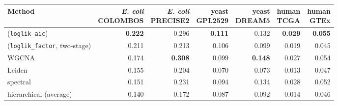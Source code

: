 \begin{tabular}{@{}lrrrrrr@{}}
\hline
Method & \shortstack{\emph{E. coli}\\COLOMBOS} & \shortstack{\emph{E. coli}\\PRECISE2} & \shortstack{yeast\\GPL2529} & \shortstack{yeast\\DREAM5} & \shortstack{human\\TCGA} & \shortstack{human\\GTEx} \\
\hline
\tool{} (\texttt{loglik\_aic}) & \textbf{0.222} & 0.296 & \textbf{0.111} & 0.132 & \textbf{0.029} & \textbf{0.055} \\
\tool{} (\texttt{loglik\_factor}, two-stage) & 0.211 & 0.213 & 0.106 & 0.099 & 0.019 & 0.045 \\
WGCNA & 0.174 & \textbf{0.308} & 0.099 & \textbf{0.148} & 0.027 & 0.054 \\
Leiden & 0.155 & 0.204 & 0.070 & 0.073 & 0.013 & 0.047 \\
spectral & 0.151 & 0.231 & 0.094 & 0.134 & 0.028 & 0.052 \\
hierarchical (average) & 0.140 & 0.172 & 0.087 & 0.092 & 0.014 & 0.046 \\
\hline
\end{tabular}
